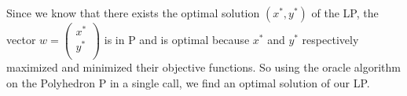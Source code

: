 \documentclass[a4paper,11pt,french]{article}
\begin{document}
    \noindent Since we know that there exists the optimal solution $(x^*, y^*)$ of the LP, the vector $w = \left(\begin{array}{c}
    x^*\\
    y^*\\  
    \end{array}
   \right )$ is in P and is optimal because $x^*$ and $y^*$ respectively maximized and minimized their objective functions. So using the oracle algorithm on the Polyhedron P in a single call, we find an optimal solution of our LP.
  
  
\end{document}
